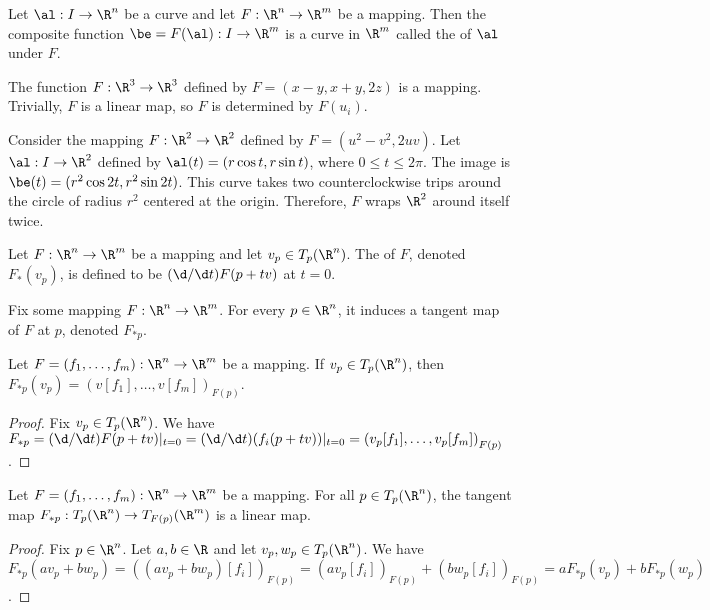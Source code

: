 \documentclass[10pt]{article}
\begin{document}
\begin{definition}
    Let $\al:I\to{\R}^{n}$ be a curve and let $F:{\R}^{n}\to{\R}^{m}$ be a mapping. Then the composite function $\be=F(\al):I\to{\R}^{m}$ is a curve in ${\R}^{m}$ called the  of $\al$ under $F$.
\end{definition}
\begin{example}
    The function $F:{\R}^{3}\to{\R}^{3}$ defined by $F=(x-y,x+y,2z)$ is a mapping. Trivially, $F$ is a linear map, so $F$ is determined by $F({u}_{i})$.
\end{example}
\begin{example}
    Consider the mapping $F:{\R}^{2}\to{\R}^{2}$ defined by $F=({u}^{2}-{v}^{2},2uv)$. Let $\al:I\to{\R}^{2}$ defined by $\al(t)=(r\cos t,r\sin t)$, where $0\le t\le 2\pi$. The image is $\be(t)=({r}^{2}\cos 2t,{r}^{2}\sin 2t)$. This curve takes two counterclockwise trips around the circle of radius ${r}^{2}$ centered at the origin. Therefore, $F$ wraps ${\R}^{2}$ around itself twice.
\end{example}
\begin{definition}
    Let $F:{\R}^{n}\to{\R}^{m}$ be a mapping and let ${v}_{p}\in{T}_{p}({\R}^{n})$. The  of $F$, denoted ${F}_{*}({v}_{p})$, is defined to be $(\d/\d t)F(p+tv)$ at $t=0$.
\end{definition}
\par
Fix some mapping $F:{\R}^{n}\to{\R}^{m}$. For every $p\in{\R}^{n}$, it induces a tangent map of $F$ at $p$, denoted ${F}_{*p}$.
\begin{proposition}
    Let $F=({f}_{1},\dots,{f}_{m}):{\R}^{n}\to{\R}^{m}$ be a mapping. If ${v}_{p}\in{T}_{p}({\R}^{n})$, then ${F}_{*p}({v}_{p})={(v[{f}_{1}],\dots,v[{f}_{m}])}_{F(p)}$.
\end{proposition}
\begin{proof}
    Fix ${v}_{p}\in{T}_{p}({\R}^{n})$. We have ${F}_{*p}=(\d/\d t)F(p+tv){\vert}_{t=0}=(\d/\d t)({f}_{i}(p+tv)){\vert}_{t=0}={({v}_{p}[{f}_{1}],\dots,{v}_{p}[{f}_{m}])}_{F(p)}$.
\end{proof}
\begin{proposition}
    Let $F=({f}_{1},\dots,{f}_{m}):{\R}^{n}\to{\R}^{m}$ be a mapping. For all $p\in{T}_{p}({\R}^{n})$,  the tangent map ${F}_{*p}:{T}_{p}({\R}^{n})\to{T}_{F(p)}({\R}^{m})$ is a linear map.
\end{proposition}
\begin{proof}
    Fix $p\in{\R}^{n}$. Let $a,b\in\R$ and let ${v}_{p},{w}_{p}\in{T}_{p}({\R}^{n})$. We have ${F}_{*p}(a{v}_{p}+b{w}_{p})={((a{v}_{p}+b{w}_{p})[{f}_{i}])}_{F(p)}={(a{v}_{p}[{f}_{i}])}_{F(p)}+{(b{w}_{p}[{f}_{i}])}_{F(p)}=a{F}_{*p}({v}_{p})+b{F}_{*p}({w}_{p})$.
\end{proof}
\end{document}
